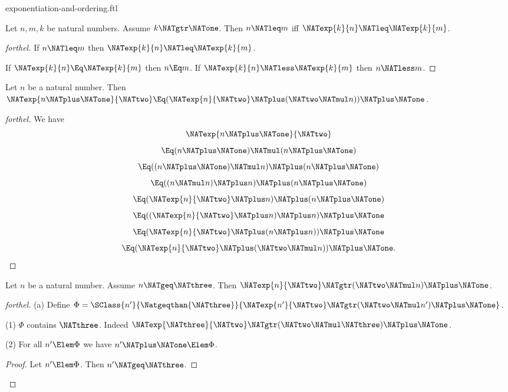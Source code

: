 \documentclass{stex}
\begin{document}
\begin{smodule}{exponentiation-and-ordering.ftl}
\begin{corollary}[forthel,id=ARITHMETIC_09_2876620253691904]
  Let $n, m, k$ be natural numbers.
  Assume $k \NATgtr \NATone$.
  Then $n \NATleq m$ iff $\NATexp{k}{n} \NATleq \NATexp{k}{m}$.
\end{corollary}
\begin{proof}[forthel]
  If $n \NATleq m$ then $\NATexp{k}{n} \NATleq \NATexp{k}{m}$.

  If $\NATexp{k}{n} \Eq \NATexp{k}{m}$ then $n \Eq m$.
  If $\NATexp{k}{n} \NATless \NATexp{k}{m}$ then $n \NATless m$.
\end{proof}

\begin{proposition}[forthel,id=ARITHMETIC_09_6984104377581568]
  Let $n$ be a natural number.
  Then $\NATexp{n \NATplus \NATone}{\NATtwo} \Eq (\NATexp{n}{\NATtwo} \NATplus (\NATtwo \NATmul n)) \NATplus \NATone$.
\end{proposition}
\begin{proof}[forthel]
  We have
  \[  \NATexp{n \NATplus \NATone}{\NATtwo}                       \]
  \[    \Eq (n \NATplus \NATone) \NATmul (n \NATplus \NATone)         \]
  \[    \Eq ((n \NATplus \NATone) \NATmul n) \NATplus (n \NATplus \NATone)   \]
  \[    \Eq ((n \NATmul n) \NATplus n) \NATplus (n \NATplus \NATone)   \]
  \[    \Eq (\NATexp{n}{\NATtwo} \NATplus n) \NATplus (n \NATplus \NATone)         \]
  \[    \Eq ((\NATexp{n}{\NATtwo} \NATplus n) \NATplus n) \NATplus \NATone         \]
  \[    \Eq (\NATexp{n}{\NATtwo} \NATplus (n \NATplus n)) \NATplus \NATone         \]
  \[    \Eq (\NATexp{n}{\NATtwo} \NATplus (\NATtwo \NATmul n)) \NATplus \NATone.    \]
\end{proof}

\begin{proposition}[forthel,id=ARITHMETIC_09_134060414337024]
  Let $n$ be a natural number.
  Assume $n \NATgeq \NATthree$.
  Then $\NATexp{n}{\NATtwo} \NATgtr (\NATtwo \NATmul n) \NATplus \NATone$.
\end{proposition}
\begin{proof}[forthel]
  (a) Define $\Phi = \SClass{n'}{\Natgeqthan{\NATthree}}{\NATexp{n'}{\NATtwo} \NATgtr (\NATtwo \NATmul n') \NATplus \NATone}$.

  (1) $\Phi$ contains $\NATthree$.
  Indeed $\NATexp{\NATthree}{\NATtwo} \NATgtr (\NATtwo \NATmul \NATthree) \NATplus \NATone$.

  (2) For all $n' \Elem \Phi$ we have $n' \NATplus \NATone \Elem \Phi$.
  \begin{proof}
    Let $n' \Elem \Phi$.
    Then $n' \NATgeq \NATthree$.


\end{proof}
\end{proof}
\end{smodule}
\end{document}
